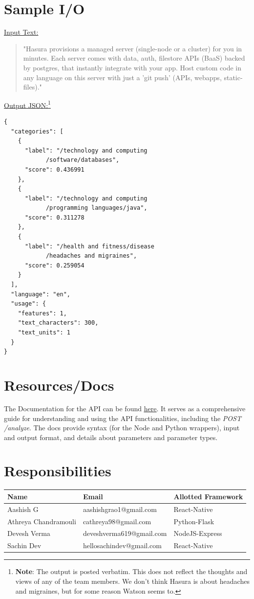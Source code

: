 \documentclass[12pt]{article}
\begin{document}
\section{Sample I/O}
	\underline{Input Text:}
	\begin{quote}
		"Hasura provisions a managed server (single-node or a cluster) for you in minutes.
		Each server comes with data, auth, filestore APIs (BaaS) backed by postgres, that instantly integrate with your app.
		Host custom code in any language on this server with just a 'git push' (APIs, webapps, static-files)."
	\end{quote}
	\underline{Output JSON:}\footnote{\textbf{Note}: The output is posted verbatim. This does not reflect the thoughts and views of any of the team members. We don't think Hasura is about headaches and migraines, but for some reason Watson seems to.}
	\begin{lstlisting}
{
  "categories": [
    {
      "label": "/technology and computing
      		/software/databases",
      "score": 0.436991
    },
    {
      "label": "/technology and computing
      		/programming languages/java",
      "score": 0.311278
    },
    {
      "label": "/health and fitness/disease
      		/headaches and migraines",
      "score": 0.259054
    }
  ],
  "language": "en",
  "usage": {
    "features": 1,
    "text_characters": 300,
    "text_units": 1
  }
}
	\end{lstlisting}


\section{Resources/Docs}
The Documentation for the API can be found \href{https://www.ibm.com/watson/developercloud/natural-language-understanding/api/v1/hashintroduction}{\underline {here}}. It serves as a comprehensive guide for understanding and using the API functionalities, including the \emph{POST /analyze}. The docs provide syntax (for the Node and Python wrappers), input and output format, and details about parameters and parameter types.

\section{Responsibilities}
\begin{tabular}{|l|l|l|}
\hline
\textbf{Name} & \textbf{Email} & \textbf{Allotted Framework}} \\
\hline
\hline
Aashish G & aashishgrao1@gmail.com & React-Native \\
\hline
Athreya Chandramouli & cathreya98@gmail.com & Python-Flask \\
\hline
Devesh Verma & deveshverma619@gmail.com & NodeJS-Express \\
\hline
Sachin Dev & hellosachindev@gmail.com & React-Native\\
\hline
\end{tabular}
\end{document}
